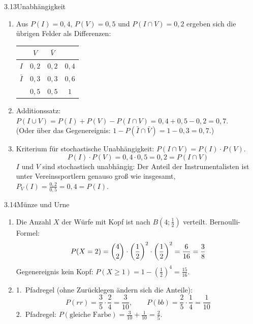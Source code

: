 \begin{loesung}{3.13}{Unabhängigkeit}
\begin{enumerate}[label=\alph*)]
  \item Aus $P(I)=0{,}4$, $P(V)=0{,}5$ und $P(I\cap V)=0{,}2$ ergeben sich die übrigen Felder als Differenzen:
  \begin{center}\begin{tabular}{|c|c|c|c|}
    \hline
     & $V$ & $\bar{V}$ & \\
    \hline
    $I$ & $0{,}2$ & $0{,}2$ & $0{,}4$\\
    \hline
    $\bar{I}$ & $0{,}3$ & $0{,}3$ & $0{,}6$\\
    \hline
     & $0{,}5$ & $0{,}5$ & $1$\\
    \hline
  \end{tabular}\end{center}
  \item Additionssatz: $P(I\cup V) = P(I)+P(V)-P(I\cap V) = 0{,}4+0{,}5-0{,}2 = 0{,}7$.\\
  (Oder über das Gegenereignis: $1-P(\bar{I}\cap\bar{V}) = 1-0{,}3 = 0{,}7$.)
  \item Kriterium für stochastische Unabhängigkeit: $P(I\cap V) = P(I)\cdot P(V)$.
  \[P(I)\cdot P(V) = 0{,}4\cdot 0{,}5 = 0{,}2 = P(I\cap V)\]
  $I$ und $V$ sind stochastisch unabhängig: Der Anteil der Instrumentalisten ist unter Vereinssportlern genauso groß wie insgesamt, $P_V(I) = \frac{0{,}2}{0{,}5} = 0{,}4 = P(I)$.
\end{enumerate}
\end{loesung}

\begin{loesung}{3.14}{Münze und Urne}
\begin{enumerate}[label=\alph*)]
  \item Die Anzahl $X$ der Würfe mit Kopf ist nach $B(4;\frac{1}{2})$ verteilt. Bernoulli-Formel:
  \[P(X=2) = \dbinom{4}{2}\cdot\left(\dfrac{1}{2}\right)^2\cdot\left(\dfrac{1}{2}\right)^2 = \dfrac{6}{16} = \dfrac{3}{8}\]
  Gegenereignis \glqq kein Kopf\grqq: $P(X\geq 1) = 1-\left(\frac{1}{2}\right)^4 = \frac{15}{16}$.
  \item 1.~Pfadregel (ohne Zurücklegen ändern sich die Anteile):
  \[P(rr) = \dfrac{3}{5}\cdot\dfrac{2}{4} = \dfrac{3}{10},\qquad P(bb) = \dfrac{2}{5}\cdot\dfrac{1}{4} = \dfrac{1}{10}\]
  2.~Pfadregel: $P(\text{gleiche Farbe}) = \frac{3}{10}+\frac{1}{10} = \frac{2}{5}$.
\end{enumerate}
\end{loesung}


